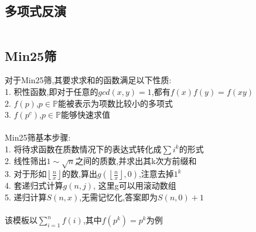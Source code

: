 \documentclass[twocolumn,a4]{article}
\begin{document}
\subsection{多项式反演}
\begin{lstlisting}

\end{lstlisting}

\subsection{Min25筛}
对于Min25筛,其要求求和的函数满足以下性质:\\
1. 积性函数,即对于任意的$gcd(x,y)=1$,都有$f(x)f(y)=f(xy)$\\
2. $f(p)$,$p\in \mathbb{P} $能被表示为项数比较小的多项式\\
3. $f(p^{c})$,$p\in \mathbb{P}$能够快速求值\\
\\
Min25筛基本步骤:\\
1. 将待求函数在质数情况下的表达式转化成$ \sum i^{k} $的形式\\
2. 线性筛出$1\sim \sqrt{n} $之间的质数,并求出其k次方前缀和\\
3. 对于形如$\left\lfloor \frac{n}{x}  \right\rfloor $的数,算出$g(\left\lfloor \frac{n}{x}  \right\rfloor,0)$,注意去掉$1^{k}$\\
4. 套递归式计算$g(n,j)$, 这里g可以用滚动数组\\
5. 递归计算$S(n,x)$,无需记忆化,答案即为$S(n,0)+1$\\
\\
该模板以$\sum_{i=1}^{n}f(i)$,其中$f(p^{k})=p^{k}$为例\\
\end{document}
